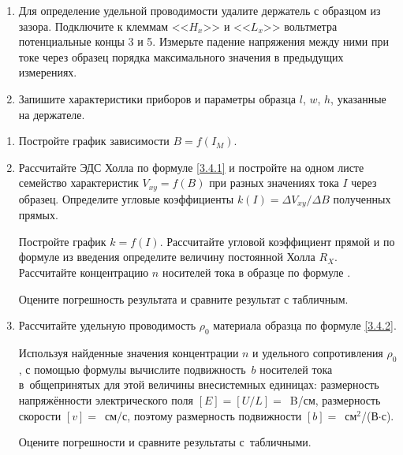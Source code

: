\begin{lab:task}
\begin{enumerate}
{Направление тока в образце показано знаками <<$+$>> и <<$-$>> на рис.~. Направление тока в обмотках электромагнита при установке разъёма $K_1$ в положение I показано стрелкой на торце магнита.

Зарисуйте в тетради образец. Укажите на рисунке направления тока, магнитного поля и отклонение носителей. По знаку
($\pm$) на клеммах цифрового вольтметра определите характер проводимости.}

\item{Для определение удельной проводимости удалите держатель с образцом из зазора. Подключите к клеммам <<$H_{x}$>> и <<$L_{x}$>> вольтметра потенциальные концы 3 и 5. Измерьте падение напряжения между ними при токе через образец порядка максимального значения в предыдущих измерениях.}

\item{ Запишите характеристики приборов и параметры образца $l$, $w$, $h$, указанные на держателе.}
\end{enumerate}

\begin{enumerate}

\item {Постройте график зависимости $B=f(I_{M})$.}

\item{ Рассчитайте ЭДС Холла по формуле \eqref{3.4.1} и постройте на одном листе семейство характеристик $V_{xy}=f(B)$ при разных значениях тока $I$ через образец. Определите угловые коэффициенты $k(I)=\Delta{V_{xy}}/\Delta B$ полученных прямых.

Постройте график $k=f(I)$. Рассчитайте угловой коэффициент прямой и по формуле  из введения определите величину постоянной Холла $R_{X}$. Рассчитайте концентрацию $n$ носителей тока в образце по формуле .

Оцените погрешность результата и сравните результат с табличным.}


\item{ Рассчитайте удельную проводимость $\rho_0$ материала образца по формуле \eqref{3.4.2}.

Используя найденные значения концентрации $n$ и удельного сопротивления $\rho_0$, с помощью формулы  вычислите подвижность~$b$ носителей тока в~общепринятых для этой величины внесистемных единицах: размерность напряжённости электрического поля $[E]=[U/L]=$~B/см, размерность скорости $[v]=$~см/с, поэтому размерность
подвижности $[b]=$~см$^2$/(В$\cdot$с).

Оцените погрешности и сравните результаты с~табличными.}
\end{enumerate}
\end{lab:task}

